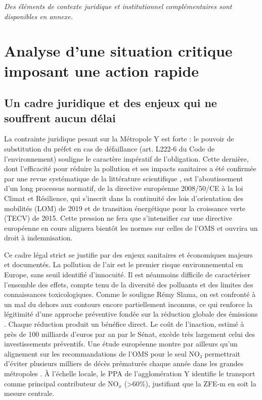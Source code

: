 \documentclass[12pt,a4paper]{article}
\begin{document}
\textit{Des éléments de contexte juridique et institutionnel complémentaires sont disponibles en annexe.}


\section{Analyse d'une situation critique imposant une action rapide}

\subsection{Un cadre juridique et des enjeux qui ne souffrent aucun délai}

La contrainte juridique pesant sur la Métropole Y est forte : le pouvoir de substitution du préfet en cas de défaillance (art. L222-6 du Code de l'environnement) souligne le caractère impératif de l'obligation. Cette dernière, dont l'efficacité pour réduire la pollution et ses impacts sanitaires a été confirmée par une revue systématique de la littérature scientifique \parencite{brosterSystematicReviewPollution2025}, est l'aboutissement d'un long processus normatif, de la directive européenne 2008/50/CE à la loi \og Climat et Résilience\fg{}, qui s'inscrit dans la continuité des lois d'orientation des mobilités (LOM) de 2019 et de transition énergétique pour la croissance verte (TECV) de 2015. Cette pression ne fera que s'intensifier car une directive européenne en cours alignera bientôt les normes sur celles de l’OMS et ouvrira un droit à indemnisation.

Ce cadre légal strict se justifie par des enjeux sanitaires et économiques majeurs et documentés. La pollution de l’air est le premier risque environnemental en Europe, sans seuil identifié d’innocuité. Il est néanmoins difficile de caractériser l’ensemble des effets, compte tenu de la diversité des polluants et des limites des connaissances toxicologiques. Comme le souligne Rémy Slama, on est confronté à un \og mal du dehors\fg{} aux contours encore partiellement inconnus, ce qui renforce la légitimité d’une approche préventive fondée sur la réduction globale des émissions \parencite{slama2017mal}.
Chaque réduction produit un bénéfice direct. Le coût de l’inaction, estimé à près de 100 milliards d’euros par an par le Sénat, excède très largement celui des investissements préventifs. Une étude européenne montre par ailleurs qu’un alignement sur les recommandations de l’OMS pour le seul NO₂ permettrait d’éviter plusieurs milliers de décès prématurés chaque année dans les grandes métropoles \parencite{khomenkoPrematureMortalityDue2021}. À l’échelle locale, le PPA de l’agglomération Y identifie le transport comme principal contributeur de NO$_x$ (>60\%), justifiant que la ZFE-m en soit la mesure centrale.
\end{document}
